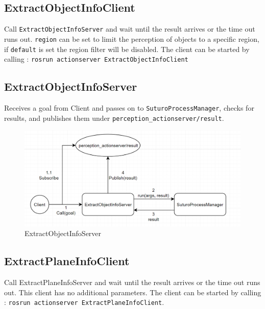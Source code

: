 \documentclass[main.tex]{subfiles}
\begin{document}
            \subsection{ExtractObjectInfoClient}
Call \texttt{ExtractObjectInfoServer} and wait until the result arrives or the time out runs out. \texttt{region} can be set to limit the perception of objects to a specific region, if \texttt{default} is set the region filter will be disabled. The client can be started by calling : \texttt{rosrun actionserver ExtractObjectInfoClient}

            \subsection{ExtractObjectInfoServer}
Receives a goal from Client and passes on to \texttt{SuturoProcessManager}, checks for results, and publishes them under \texttt{perception\_actionserver/result}. 
            \begin{figure}[H]
                \centering
                 \includegraphics[width=1\textwidth]{pictures/perception/suturo_ExtractObjectInfoServer.png}
                \caption{ExtractObjectInfoServer}
              \end{figure}

            \subsection{ExtractPlaneInfoClient}
Call ExtractPlaneInfoServer and wait until the result arrives or the time out runs out. This client has no additional parameters.
The client can be started by calling : \texttt{rosrun actionserver ExtractPlaneInfoClient}.
\end{document}
